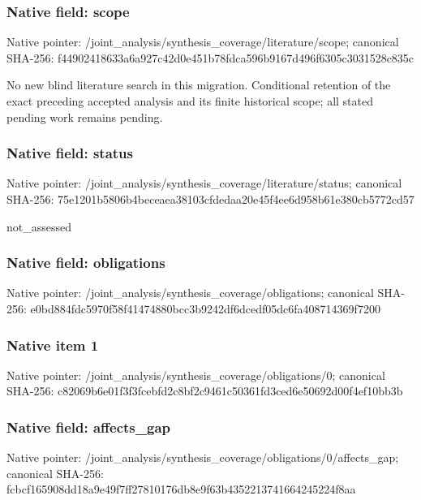 \documentclass[10pt,a4paper]{article}
\begin{document}
\subsubsection{Native field: scope}
Native pointer: /joint\_\allowbreak{}analysis/synthesis\_\allowbreak{}coverage/literature/scope; canonical SHA-256: f44902418633a6a927c42d0e451b78fdca596b9167d496f6305c3031528c835c

\begingroup\raggedright\sloppy No new blind literature search in this migration. Conditional retention of the exact preceding accepted analysis and its finite historical scope;\allowbreak{} all stated pending work remains pending.\par\endgroup

\subsubsection{Native field: status}
Native pointer: /joint\_\allowbreak{}analysis/synthesis\_\allowbreak{}coverage/literature/status; canonical SHA-256: 75e1201b5806b4beceaea38103cfdedaa20e45f4ee6d958b61e380cb5772cd57

\begingroup\raggedright\sloppy not\_\allowbreak{}assessed\par\endgroup

\subsubsection{Native field: obligations}
Native pointer: /joint\_\allowbreak{}analysis/synthesis\_\allowbreak{}coverage/obligations; canonical SHA-256: e0bd884fdc5970f58f41474880bcc3b9242df6dcedf05dc6fa408714369f7200

\subsubsection{Native item 1}
Native pointer: /joint\_\allowbreak{}analysis/synthesis\_\allowbreak{}coverage/obligations/0; canonical SHA-256: c82069b6e01f3f3fcebfd2c8bf2c9461c50361fd3ced6e50692d00f4ef10bb3b

\subsubsection{Native field: affects\_\allowbreak{}gap}
Native pointer: /joint\_\allowbreak{}analysis/synthesis\_\allowbreak{}coverage/obligations/0/affects\_\allowbreak{}gap; canonical SHA-256: fcbcf165908dd18a9e49f7ff27810176db8e9f63b4352213741664245224f8aa
\end{document}
